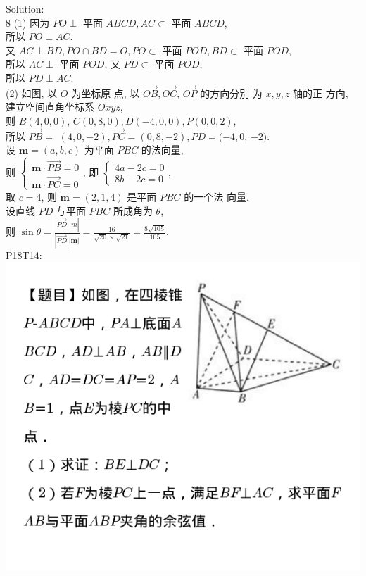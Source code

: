 \documentclass[a4paper,11pt,UTF8]{article}
\begin{document}
Solution:\\
8 (1) 因为 $P O \perp$ 平面 $A B C D, A C \subset$ 平面 $A B C D$, \\所以 $P O \perp A C$.\\
又 $A C \perp B D, P O \cap B D=O, P O \subset$ 平面 $P O D, B D \subset$ 平面 $P O D$, \\所以 $A C \perp$ 平面 $P O D$, 又 $P D \subset$ 平面 $P O D$,\\ 所以 $P D \perp A C$.\\
(2) 如图, 以 $O$ 为坐标原 点, 以 $\overrightarrow{O B}, \overrightarrow{O C}$, $\overrightarrow{O P}$ 的方向分别 为 $x, y, z$ 轴的正 方向, 建立空间直角坐标系 $O x y z$,\\
 则 $B(4,0,0)$, $C(0,8,0), D(-4,0,0), P(0,0,2)$,\\ 所以 $\overrightarrow{P B}=$ $(4,0,-2), \overrightarrow{P C}=(0,8,-2), \overrightarrow{P D}=(-4,0$, $-2)$.\\
设 $\boldsymbol{m}=(a, b, c)$ 为平面 $P B C$ 的法向量,\\
则 $\left\{\begin{array}{l}\boldsymbol{m} \cdot \overrightarrow{P B}=0 \\ \boldsymbol{m} \cdot \overrightarrow{P C}=0\end{array}\right.$, 即 $\left\{\begin{array}{l}4 a-2 c=0 \\ 8 b-2 c=0\end{array}\right.$,\\
取 $c=4$, 则 $\boldsymbol{m}=(2,1,4)$ 是平面 $P B C$ 的一个法 向量.\\
设直线 $P D$ 与平面 $P B C$ 所成角为 $\theta$,\\
则 $\displaystyle \sin \theta=\frac{|\overrightarrow{P D} \cdot m|}{|\overrightarrow{P D}||\boldsymbol{m}|}=\frac{16}{\sqrt{20} \times \sqrt{21}}=\frac{8 \sqrt{105}}{105}$.\\
P18T14:\\
\includegraphics[scale=0.5]{./P18T14.jpg}\\
\end{document}
